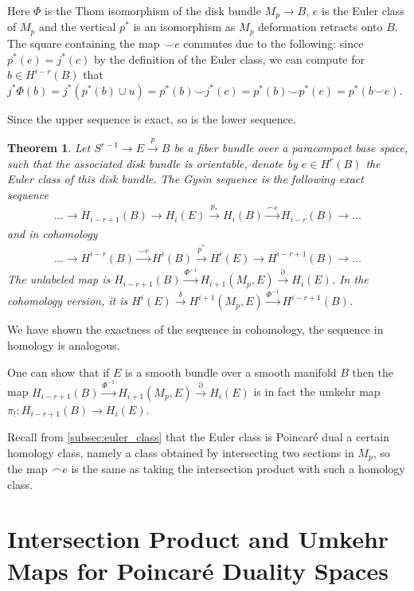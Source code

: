 \documentclass{scrartcl}
\theoremstyle{plain}
\newtheorem{theorem}{Theorem}[section]
\theoremstyle{definition}
\newcommand{\capp}{\mathbin{\frown}}
\newcommand{\cupp}{\mathbin{\smile}}
\begin{document}
Here $\Phi$ is the Thom isomorphism of the disk bundle $M_p\to B$, $e$ is the Euler class of $M_p$ and the vertical $p^*$ is an isomorphism as $M_p$ deformation retracts onto $B$. The square containing the map $\cupp e$ commutes due to the following: since $p^*(e) = j^*(c)$ by the definition of the Euler class, we can compute for $b\in H^{i-r}(B)$ that $j^*\Phi(b) = j^*(p^*(b)\cup u) = p^*(b) \cupp j^*(c) = p^*(b) \cupp p^*(e) = p^*(b\cupp e)$. 

Since the upper sequence is exact, so is the lower sequence.

\begin{theorem}
    Let $S^{r-1} \to E \xrightarrow{p} B$ be a fiber bundle over a paracompact base space, such that the associated disk bundle is orientable, denote by $e\in H^r(B)$ the Euler class of this disk bundle. The \emph{Gysin sequence} is the following exact sequence
    \begin{align*}
        \dots \to H_{i-r+1}(B) \to H_i(E) \xrightarrow{p_*} H_i(B) \xrightarrow{\capp e} H_{i-r}(B) \to \dots
    \end{align*}
    and in cohomology
    \begin{align*}
        \dots \to H^{i-r}(B) \xrightarrow{\cupp e} H^i(B) \xrightarrow{p^*} H^i(E) \to H^{i-r+1}(B)\to \dots
    \end{align*}
    The unlabeled map is $H_{i-r+1}(B) \xrightarrow{\Phi^{-1}} H_{i+1}(M_p, E) \xrightarrow{\partial} H_i(E)$. In the cohomology version, it is $H^i(E) \xrightarrow{\delta} H^{i+1}(M_p, E) \xrightarrow{\Phi^{-1}} H^{i-r+1}(B)$. 
\end{theorem}

We have shown the exactness of the sequence in cohomology, the sequence in homology is analogous. 

One can show that if $E$ is a smooth bundle over a smooth manifold $B$ then the map $H_{i-r+1}(B) \xrightarrow{\Phi^{-1}} H_{i+1}(M_p, E) \xrightarrow{\partial} H_i(E)$ is in fact the umkehr map $\pi_!\colon H_{i-r+1}(B) \to H_i(E)$. 

Recall from \ref{subsec:euler_class} that the Euler class is Poincaré dual a certain homology class, namely a class obtained by intersecting two sections in $M_p$, so the map $\capp e$ is the same as taking the intersection product with such a homology class. 

\section{Intersection Product and Umkehr Maps for Poincaré Duality Spaces}\label{sec:intersection_product}
\end{document}

